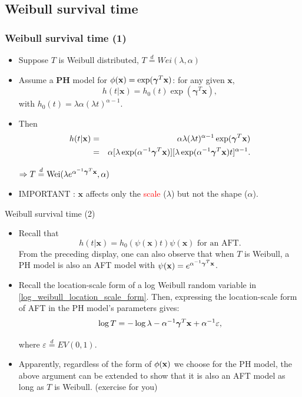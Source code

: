 \documentclass{beamer}
\newcommand{\boldgamma}{{\boldsymbol \gamma}}
\newenvironment{wideitemize}%
  {\begin{itemize}%
    \setlength{\parskip}{1em}}%
  {\end{itemize}}
\newcommand{\currentsubsection}{}
\let\oldsubsection\subsection
\renewcommand{\subsection}[1]{\oldsubsection{#1}\renewcommand{\currentsubsection}{#1}}
\begin{document}
\subsection{Weibull survival time}
\begin{frame}\frametitle{ Weibull survival time (1)} 
\begin{itemize}

\item Suppose $T$ is Weibull distributed, $T \stackrel{d}{=} Wei (\lambda, \alpha)$
\item Assume a {\bf PH} model for $\phi({\bf x}) = \exp( {\boldgamma}^T{\bf x})$: for any given $\mathbf{x}$, 
 \[
 h(t|\mathbf{x})=h_0(t)\exp({\boldsymbol \gamma}^T\mathbf{x}),
 \]
with $h_0(t) = \lambda \alpha (\lambda t)^{\alpha -1}$. 
\item
Then 
\begin{eqnarray*}
h(t|\mathbf{x})&=&\alpha\lambda(\lambda t)^{\alpha-1}\exp(\mbox{\boldmath $\gamma$}^T\mathbf{x}) \\
&=& \alpha [\lambda\exp(\alpha^{-1}\mbox{\boldmath $\gamma$}^T\mathbf{x})] [\lambda
\exp(\alpha^{-1}\mbox{\boldmath $\gamma$}^T\mathbf{x})t]^{\alpha-1}.
\end{eqnarray*}

$\Rightarrow T\stackrel{d}{=}\mbox{Wei}(\lambda e^{\alpha^{-1}
\mbox{\footnotesize \boldmath $\gamma$}^T\mathbf{x}}, \alpha)$


\item 
  IMPORTANT : $\mathbf{x}$ affects only the \textcolor{red}{scale} ($
 \lambda$) but not the shape ($\alpha$).
 

\end{itemize}
\end{frame}

\begin{frame}{Weibull survival time (2)}
\begin{wideitemize}
 \item Recall that 
 \[
 h(t|\mathbf{x})=h_0(\psi(\mathbf{x})t)\psi(\mathbf{x}) \text{ for an AFT.}
 \]
  From the preceding display, one can also observe that when $T$ is Weibull, a PH model is also an AFT model with $\psi({\bf x})  = e^{\alpha^{-1} \boldgamma^T{\bf x}}$. 

 
\item Recall  the location-scale form of a log  Weibull random variable in \eqref{log_weibull_location_scale_form}. Then, expressing the location-scale form of AFT in the PH model's parameters gives:
\[\log T=-\log\lambda-\alpha^{-1}\mbox{\boldmath $\gamma$}^T\mathbf{x}+
\alpha^{-1}\varepsilon, \]


where $\varepsilon\stackrel{d}{=}EV(0,1)$.

\item Apparently, regardless of the form of $\phi({\bf x})$ we choose for the PH model, the above argument can be extended to show that it is also an AFT model as long as  $T$ is Weibull. (exercise for you)

\end{wideitemize}

\end{frame}
\end{document}
